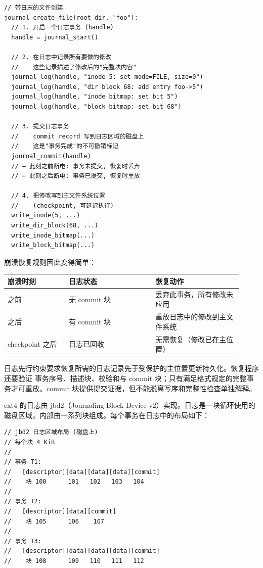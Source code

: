 \begin{filesystemlayout}
\begin{lstlisting}
// 带日志的文件创建
journal_create_file(root_dir, "foo"):
  // 1. 开启一个日志事务 (handle)
  handle = journal_start()

  // 2. 在日志中记录所有要做的修改
  //    这些记录描述了修改后的"完整块内容"
  journal_log(handle, "inode 5: set mode=FILE, size=0")
  journal_log(handle, "dir block 68: add entry foo->5")
  journal_log(handle, "inode bitmap: set bit 5")
  journal_log(handle, "block bitmap: set bit 68")

  // 3. 提交日志事务
  //    commit record 写到日志区域的磁盘上
  //    这是"事务完成"的不可撤销标记
  journal_commit(handle)
  // ← 此刻之前断电: 事务未提交, 恢复时丢弃
  // ← 此刻之后断电: 事务已提交, 恢复时重放

  // 4. 把修改写到主文件系统位置
  //    (checkpoint, 可延迟执行)
  write_inode(5, ...)
  write_dir_block(68, ...)
  write_inode_bitmap(...)
  write_block_bitmap(...)
\end{lstlisting}

崩溃恢复规则因此变得简单：

\begin{longtable}{|F{0.24\linewidth}|F{0.34\linewidth}|F{0.34\linewidth}|}
\toprule
{}
崩溃时刻 & 日志状态 & 恢复动作 \\
\midrule
{} 之前 & 无 commit 块 & 丢弃此事务，所有修改未应用 \\\tablerowrule
{} 之后 & 有 commit 块 & 重放日志中的修改到主文件系统 \\\tablerowrule
checkpoint 之后 & 日志已回收 & 无需恢复（修改已在主位置） \\
\bottomrule
\end{longtable}

\begin{keyidea}
日志先行约束要求恢复所需的日志记录先于受保护的主位置更新持久化。恢复程序还要验证
事务序号、描述块、校验和与 commit 块；只有满足格式规定的完整事务才可重放。commit
块提供提交证据，但不能脱离写序和完整性检查单独解释。
\end{keyidea}


ext4 的日志由 jbd2（Journaling Block Device v2）实现。日志是一块循环使用的磁盘区域，内部由一系列块组成。每个事务在日志中的布局如下：

\begin{lstlisting}
// jbd2 日志区域布局 (磁盘上)
// 每个块 4 KiB
//
// 事务 T1:
//   [descriptor][data][data][data][commit]
//    块 100      101   102   103   104
//
// 事务 T2:
//   [descriptor][data][commit]
//    块 105      106    107
//
// 事务 T3:
//   [descriptor][data][data][data][commit]
//    块 108      109   110   111   112


\end{lstlisting}
\end{filesystemlayout}
